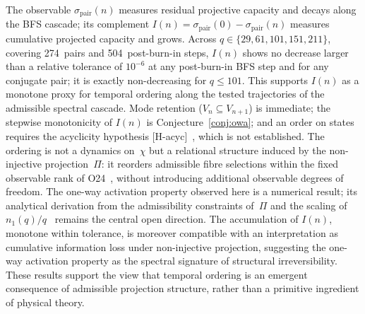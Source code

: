 \documentclass[11pt,a4paper]{article}
\begin{document}
  The observable $\sigma_{\mathrm{pair}}(n)$ measures residual projective
  capacity and decays along the BFS cascade; its complement
  $I(n) = \sigma_{\mathrm{pair}}(0) - \sigma_{\mathrm{pair}}(n)$
  measures cumulative projected capacity and grows.
  Across $q \in \{29, 61, 101, 151, 211\}$, covering 274~pairs and
  504~post-burn-in steps, $I(n)$ shows no decrease larger than a relative
  tolerance of $10^{-6}$ at any post-burn-in BFS step and for any conjugate pair;
  it is exactly non-decreasing for $q \leq 101$.
  This supports $I(n)$ as a monotone proxy for temporal ordering
  along the tested trajectories of the admissible spectral cascade.
  Mode retention ($V_n \subseteq V_{n+1}$) is immediate; the stepwise monotonicity
  of $I(n)$ is Conjecture~\ref{conj:owa}; and an order on states requires the
  acyclicity hypothesis [H-acyc]~\cite{Beau2026m}, which is not established.
  The ordering is not a dynamics on~$\chi$ but a relational structure
  induced by the non-injective projection~$\Pi$: it reorders admissible
  fibre selections within the fixed observable rank of O24~\cite{Beau2026a28},
  without introducing additional observable degrees of freedom.
  The one-way activation property observed here is a numerical result;
  its analytical derivation from the admissibility constraints of~$\Pi$
  and the scaling of $n_1(q)/q$~\cite{Beau2026a29} remains the central
  open direction.
  The accumulation of $I(n)$, monotone within tolerance, is moreover compatible with an
  interpretation as cumulative information loss under non-injective projection,
  suggesting the one-way activation property as the spectral signature of
  structural irreversibility.
  These results support the view that temporal ordering is an emergent consequence
  of admissible projection structure, rather than a primitive ingredient of physical
  theory.

  \clearpage
  
  
\end{document}
